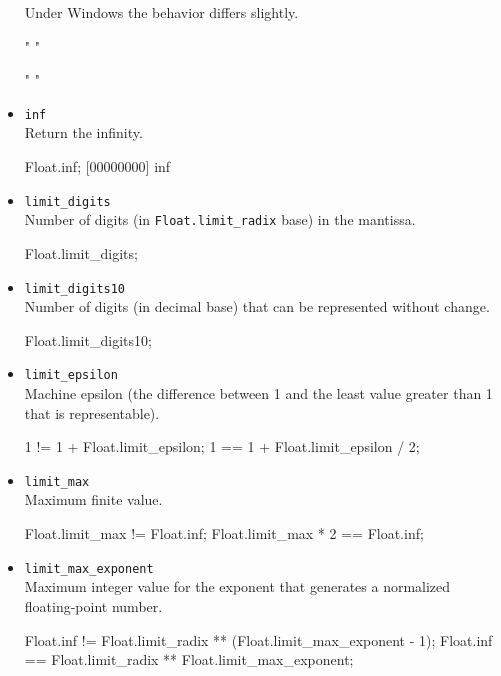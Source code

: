 \begin{itemize}
  \begin{windows}
    Under Windows the behavior differs slightly.
  \end{windows}
\begin{urbiassert}
"%
"%

"%
"%
\end{urbiassert}

\item \lstinline|inf|\\
  Return the infinity.
\begin{urbiscript}
Float.inf;
[00000000] inf
\end{urbiscript}

\item \lstinline|limit_digits|\\
  Number of digits (in \lstinline|Float.limit_radix| base) in the
  mantissa.
\begin{urbiassert}
Float.limit_digits;
\end{urbiassert}

\item \lstinline|limit_digits10|\\
  Number of digits (in decimal base) that can be represented without
  change.
\begin{urbiassert}
Float.limit_digits10;
\end{urbiassert}

\item \lstinline|limit_epsilon|\\
  Machine epsilon (the difference between 1 and the least value
  greater than 1 that is representable).
\begin{urbiassert}
1 != 1 + Float.limit_epsilon;
1 == 1 + Float.limit_epsilon / 2;
\end{urbiassert}

\item \lstinline|limit_max|\\
  Maximum finite value.
\begin{urbiassert}
Float.limit_max     != Float.inf;
Float.limit_max * 2 == Float.inf;
\end{urbiassert}

\item \lstinline|limit_max_exponent|\\
  Maximum integer value for the exponent that generates a normalized
  floating-point number.
\begin{urbiassert}
Float.inf != Float.limit_radix ** (Float.limit_max_exponent - 1);
Float.inf == Float.limit_radix ** Float.limit_max_exponent;
\end{urbiassert}


\end{itemize}

